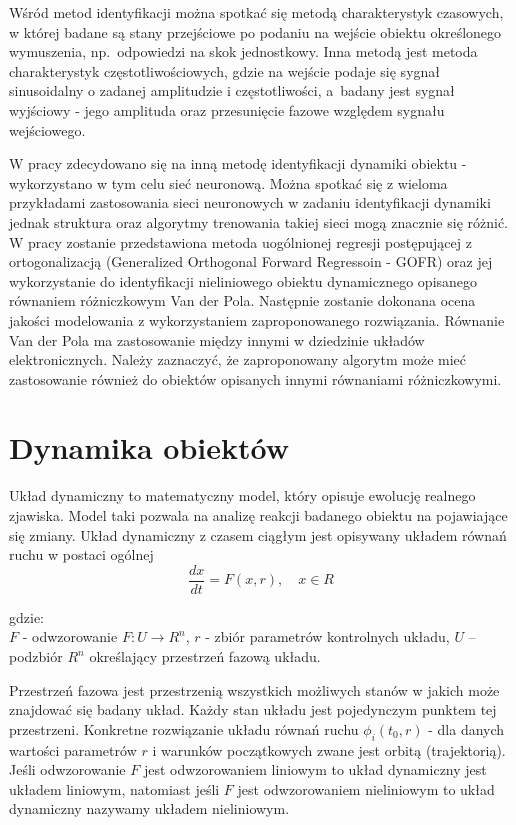	Wśród metod identyfikacji można spotkać się metodą charakterystyk czasowych, w której badane są stany przejściowe po podaniu na wejście obiektu określonego wymuszenia, np.~odpowiedzi na skok jednostkowy. Inna metodą jest metoda charakterystyk częstotliwościowych, gdzie na wejście podaje się sygnał sinusoidalny o zadanej amplitudzie i częstotliwości, a~badany jest sygnał wyjściowy - jego amplituda oraz przesunięcie fazowe względem sygnału wejściowego\cite{Czemplik}.
	
	W pracy zdecydowano się na inną metodę identyfikacji dynamiki obiektu - wykorzystano w tym celu sieć neuronową. Można spotkać się z wieloma przykładami zastosowania sieci neuronowych w zadaniu identyfikacji dynamiki jednak struktura oraz algorytmy trenowania takiej sieci  mogą znacznie się różnić. W pracy zostanie przedstawiona metoda uogólnionej regresji postępującej z ortogonalizacją (Generalized Orthogonal Forward Regressoin - GOFR) oraz jej wykorzystanie do identyfikacji nieliniowego obiektu dynamicznego opisanego równaniem różniczkowym Van der Pola. Następnie zostanie dokonana ocena jakości modelowania z wykorzystaniem zaproponowanego rozwiązania. Równanie Van der Pola ma zastosowanie między innymi w dziedzinie układów elektronicznych\cite{Palczewski}. Należy zaznaczyć, że zaproponowany algorytm może mieć zastosowanie również do obiektów opisanych innymi równaniami różniczkowymi.  

\newpage
\section{Dynamika obiektów}
Układ dynamiczny to matematyczny model, który opisuje ewolucję realnego zjawiska. Model taki pozwala na analizę reakcji badanego obiektu na pojawiające się zmiany.
Układ dynamiczny z czasem ciągłym jest opisywany układem równań ruchu w postaci ogólnej\cite{Kosinski}
\begin{equation}
	\frac{dx}{dt} = F(x,r), \quad x \in R
\end{equation}

gdzie: \\
$F$ - odwzorowanie $F:U \rightarrow R^n$,
$r$ - zbiór parametrów kontrolnych układu,
$U$ – podzbiór $R^n$ określający przestrzeń fazową układu.

Przestrzeń fazowa jest przestrzenią wszystkich możliwych stanów w jakich może znajdować się badany układ. Każdy stan układu jest pojedynczym punktem tej przestrzeni. Konkretne rozwiązanie układu równań ruchu $\phi_i(t_0,r)$ - dla danych wartości parametrów $r$ i warunków początkowych zwane jest orbitą (trajektorią). Jeśli odwzorowanie $F$ jest odwzorowaniem liniowym to układ dynamiczny jest układem liniowym, natomiast jeśli $F$ jest odwzorowaniem nieliniowym to układ dynamiczny nazywamy układem nieliniowym.

